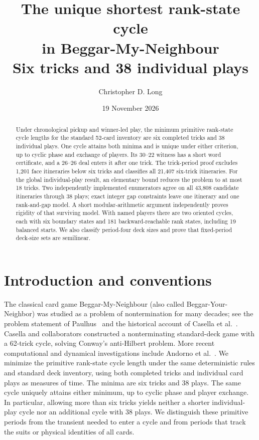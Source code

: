 \documentclass[11pt]{article}
\title{The unique shortest rank-state cycle\\in Beggar-My-Neighbour\\\large Six tricks and 38 individual plays}
\author{Christopher D. Long}
\date{19 November 2026}
\begin{document}
\maketitle

\begin{abstract}
Under chronological pickup and winner-led play, the minimum primitive
rank-state cycle lengths for the standard 52-card inventory are six completed
tricks and 38 individual plays. One cycle attains both minima and is unique
under either criterion, up to cyclic phase and exchange of players. Its
$30$--$22$ witness has a short word certificate, and a $26$--$26$ deal enters
it after one trick. The trick-period proof excludes 1,201 face itineraries
below six tricks and classifies all 21,407 six-trick itineraries. For the
global individual-play result, an elementary bound reduces the problem to
at most 18 tricks. Two independently implemented enumerators agree on all
43,808 candidate itineraries through 38 plays; exact integer gap constraints
leave one itinerary and one rank-and-gap model. A short modular-arithmetic
argument independently proves rigidity of that surviving model. With named
players there are two oriented cycles, each with six boundary states and
181 backward-reachable rank states, including 19 balanced starts. We also
classify period-four deck sizes and prove that fixed-period deck-size sets
are semilinear.
\end{abstract}

\section{Introduction and conventions}

The classical card game Beggar-My-Neighbour (also called Beggar-Your-Neighbor)
was studied as a problem of nontermination for many decades; see the problem
statement of Paulhus~\cite{paulhus} and the historical account of
Casella et al.~\cite{casella}. Casella and collaborators constructed a
nonterminating standard-deck game with a 62-trick cycle, solving Conway's
anti-Hilbert problem. More recent computational and dynamical investigations
include Andorno et al.~\cite{andorno}. We minimize the primitive rank-state
cycle length under the same deterministic rules and standard deck inventory,
using both completed tricks and individual card plays as measures of time.
The minima are six tricks and 38 plays. The same cycle uniquely attains
either minimum, up to cyclic phase and player exchange. In particular,
allowing more than six tricks yields neither a shorter individual-play cycle
nor an additional cycle with 38 plays. We distinguish these primitive periods
from the transient needed to enter a cycle and from periods that track the
suits or physical identities of all cards.
\end{document}

